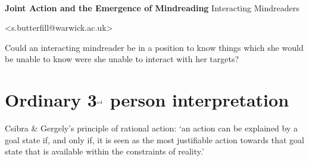 \documentclass[11pt]{extarticle}
\date{}
\begin{document}
\begin{multicols}{3}

\setlength\footnotesep{1em}






\

\begin{center}
{
\textbf{Joint Action and the Emergence of Mindreading}
\Large{Interacting Mindreaders}
}



<s.butterfill@warwick.ac.uk>

\end{center}

Could an interacting mindreader be in a position to know things which she would be unable to know were she unable to interact with her targets?



\section{Ordinary 3$^{\textrm{\tiny rd}}$ person interpretation} 

Csibra \& Gergely's principle of rational action: `an action can be explained by a goal state if, and only if, it is seen as the most justifiable action towards that goal state that is available within the constraints of reality.'\citep{Csibra:1998cx,Csibra:2003jv}


%



\end{multicols}
\end{document}
